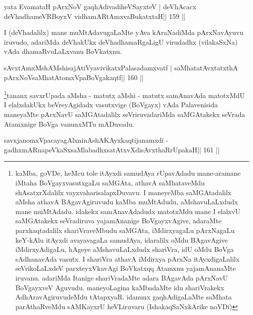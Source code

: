 \begin{shl}
yata EvamataH pArxNoV gaqhAdivadiheVSayxteV |
deVhAcacx deVhadhameVRBoyxV vidhamARtAmx\s vaBukatxtaH\hfill || 159 ||
\end{shl}

\begin{artha}
I (deVhadalilx) mane muMtAdavugaLaMte yAva kAraNadiMda pArxNavAyuvu iruvudo, adariMda deVhakUkx deVhadhamaRgaLigU virudadhx (vilakaSxNa) vAda dhamaRvuLaLxvanu BoVkatxnu.
\end{artha}


\begin{shl}
sAvxtAmxMshAMshisajAtiVyavivikatxPalasadamxvatf |
saMhatatAvxtatxthA pArxNoV\s saMhatAtomxVpaBoVgakaqtf\hfill || 160 ||
\end{shl}

\begin{artha}
\footnote[8]{kaMba, goVDe, heMcu tole itAyxdi samudAya rUpavAdadu 
mane-aramane iMtaha BoVgayxvasutxgaLu saMGAta, athavA saMhataveMdu 
shAsatxrXdalilx vayxvaharisalapxDuvavu. I maneyeMba saMGAtadalilx aMsha 
athavA BAgavAgiruvudu kaMba muMtAdudu, aMshavuLaLxdudx mane muMtAdadu. 
idakekx samAnavAdadudx matotxMdu mane I elalxvU saMGAtakekx seVradiruva 
yajamAnanige BoVgayxvAgive, adaraMte parxkaqtadalilx shariVraveMbudu 
saMGAta, iMdirxyagaLu pArxNagaLu keY-kAlu itAyxdi avayavagaLa samudAya, 
idaralilx oMdu BAgavAgive iMdirxyAdigaLu, hAgeye aMshavuLaLxdudx 
shariVra, idU oMdu BoVga sAdhanavAda vasutx. I shariVra athavA iMdirxya 
pArxNa itAyxdigaLalilx seVrikoLaLxdeV parxteyxVkavAgi BoVkatxqq Atamxnu yajamAnanaMte iruvanu. adariMda Itanige shariVradaMte adara BAgavAda pArxNavU BoVgayxveV Aguvudu. maneyoLagina kaMbadaMte idu shariVrakekx AdhAravAgiruvudeMdu tAtapxyaR. idanunx gaqhAdigaLaMte saMhata parAthaRveMdu sAMKayxrU heVLiruvaru (IshakaqSaNxkArike noVDi)}tananx savxrUpada aMsha - matutx aMshi - matutx samAnavAda matotxMdU I elalxdakUkx beVreyAgidadx vasutxvige (BoVgayx) vAda Palavenisida maneyaMte pArxNavU saMGAtadalilx seVriruvadariMda saMGAtakekx seVrada Atamxnige BoVga	vanunxMTu mADuvadu.
\end{artha}


\begin{shl}
savxjanomxVpacayagAlxninAshAKAyxkaqtijanamxdi -
gadhxmARnapeVkaSxsaMlabadhxsatAtxvXdisAvxthaRrUpakaH\hfill || 161 ||
\end{shl}

